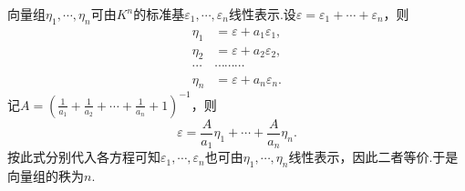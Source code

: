 \begin{sol}[法二]
	向量组$\eta_1,\cdots,\eta_n$可由$K^n$的标准基$\varepsilon_1,\cdots,\varepsilon_n$线性表示.设$\varepsilon=\varepsilon_1+\cdots+\varepsilon_n$，则
	\begin{align*}
		\eta_1 & =\varepsilon+a_1\varepsilon_1, \\
		\eta_2 & =\varepsilon+a_2\varepsilon_2, \\
		\cdots & \cdots\cdots\cdots             \\
		\eta_n & =\varepsilon+a_n\varepsilon_n.
	\end{align*}
	记$A=\left(\frac{1}{a_1}+\frac{1}{a_2}+\cdots+\frac{1}{a_n}+1\right)^{-1}$，则
	\[
		\varepsilon=\frac{A}{a_1}\eta_1+\cdots+\frac{A}{a_n}\eta_n.
	\]
	按此式分别代入各方程可知$\varepsilon_1,\cdots,\varepsilon_n$也可由$\eta_1,\cdots,\eta_n$线性表示，因此二者等价.于是向量组的秩为$n$.
\end{sol}
